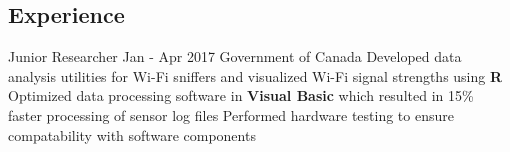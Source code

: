 \documentclass[]{aanguyen_res}
\begin{document}
	\begin{main}%
		\vspace{35pt}%
		\section{Experience}
			\mainentry%
				{Junior Researcher}%
				{Jan - Apr 2017}%
				{Government of Canada}%
				{}%
				{\faCaretRight Developed data analysis utilities for Wi-Fi sniffers and visualized Wi-Fi signal strengths using \textbf{R}
				  \faCaretRight Optimized data processing software in \textbf{Visual Basic} which resulted in 15\% faster processing of sensor log files
				  \faCaretRight Performed hardware testing to ensure compatability with software components}
			\vspace{0.65cm}%

\end{main}
\end{document}
